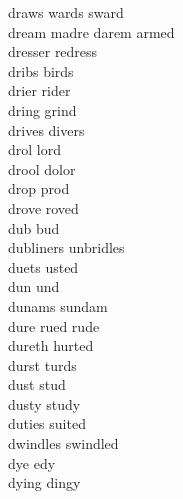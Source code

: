 draws wards sward\\
dream madre darem armed\\
dresser redress\\
dribs birds\\
drier rider\\
dring grind\\
drives divers\\
drol lord\\
drool dolor\\
drop prod\\
drove roved\\
dub bud\\
dubliners unbridles\\
duets usted\\
dun und\\
dunams sundam\\
dure rued rude\\
dureth hurted\\
durst turds\\
dust stud\\
dusty study\\
duties suited\\
dwindles swindled\\
dye edy\\
dying dingy\\

